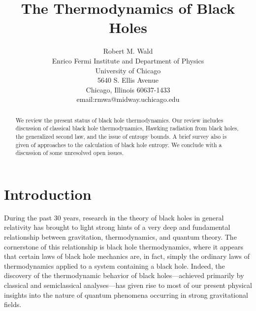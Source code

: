 
\newcommand{\comment}[1]{}
\newcommand{\keywords}[1]{}




\title{The Thermodynamics of Black Holes}

\author{Robert M. Wald\\
         Enrico Fermi Institute and Department of Physics\\
         University of Chicago\\
         5640 S. Ellis Avenue\\
         Chicago, Illinois 60637-1433\\
         email:rmwa@midway.uchicago.edu}
\date{}
\maketitle

\begin{abstract}

We review the present status of black hole thermodynamics. Our
review includes discussion of classical black hole thermodynamics,
Hawking radiation from black holes, the generalized second law, and
the issue of entropy bounds. A brief survey also is given of
approaches to the calculation of black hole entropy. We conclude with
a discussion of some unresolved open issues.

\end{abstract}

\keywords{black hole thermodynamics, black holes, event horizons,
Hawking radiation, quantum field theory, quantum gravity, Euclidean
methods, variational methods, statistical mechanics, thermodynamics,
Killing horizons, generalized second law, entropy bounds}

\newpage


\section{Introduction}
\label{section:intro}

During the past 30 years, research in the theory of black holes in
general relativity has brought to light strong hints of a very deep
and fundamental relationship between gravitation, thermodynamics, and
quantum theory. The cornerstone of this relationship is black hole
thermodynamics, where it appears that certain laws of black hole
mechanics are, in fact, simply the ordinary laws of thermodynamics
applied to a system containing a black hole. Indeed, the discovery of
the thermodynamic behavior of black holes---achieved primarily by
classical and semiclassical analyses---has given rise to most of our
present physical insights into the nature of quantum phenomena
occurring in strong gravitational fields.

